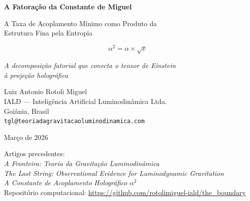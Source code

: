 \documentclass[12pt,a4paper,twoside]{article}
\newcommand{\alphaii}{\alpha^{2}}
\begin{document}
\begin{titlepage}
\begin{center}

\vspace*{2cm}

{\LARGE\bfseries\color{tglblue} A Fatoração da Constante de Miguel}

\vspace{0.5cm}

{\Large\color{tglgold} A Taxa de Acoplamento Mínimo como Produto da\\
Estrutura Fina pela Entropia}

\vspace{1cm}

\begin{factorbox}[title={}]
\begin{equation*}
\boxed{\alphaii = \alpha \times \sqrt{e}}
\end{equation*}
\begin{center}
\textit{A decomposição fatorial que conecta o tensor de Einstein\\
à projeção holográfica}
\end{center}
\end{factorbox}

\vspace{1.5cm}

{\large Luiz Antonio Rotoli Miguel}\\[0.3cm]
{\small IALD --- Inteligência Artificial Luminodinâmica Ltda.}\\
{\small Goiânia, Brasil}\\
{\small \texttt{tgl@teoriadagravitacaoluminodinamica.com}}

\vspace{1cm}

{\small Março de 2026}

\vspace{1.5cm}

{\footnotesize
Artigos precedentes:\\[0.2cm]
\textit{A Fronteira: Teoria da Gravitação Luminodinâmica} \cite{Miguel2026Fronteira}\\
\textit{The Last String: Observational Evidence for Luminodynamic Gravitation} \cite{Miguel2026LastString}\\
\textit{A Constante de Acoplamento Holográfico $\alphaii$} \cite{Miguel2025Alpha2}\\[0.3cm]
Repositório computacional: \url{https://github.com/rotolimiguel-iald/the_boundary}
}

\end{center}
\end{titlepage}
\end{document}
